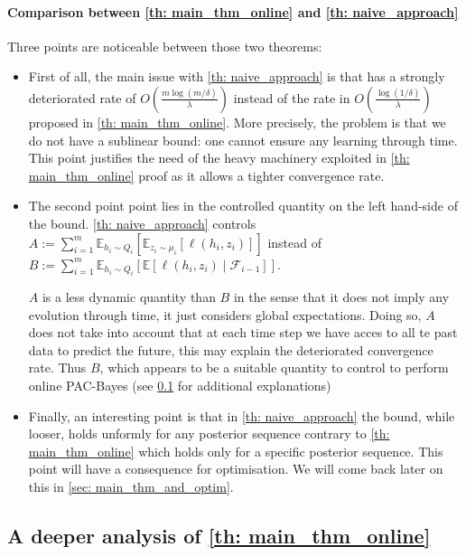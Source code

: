 \paragraph{Comparison between \cref{th: main_thm_online} and \cref{th: naive_approach}}   Three points are noticeable between those two theorems:

\begin{itemize}
  \item First of all, the main issue with \cref{th: naive_approach} is that has a strongly deteriorated rate of $O\left(\frac{m\log(m/\delta)}{\lambda} \right)$ instead of the rate in  $O\left(\frac{\log(1/\delta)}{\lambda} \right)$ proposed in \cref{th: main_thm_online}.
  More precisely, the problem is that we do not have a sublinear bound: one cannot ensure any learning through time.
  This point justifies the need of the heavy machinery exploited in \cref{th: main_thm_online} proof as it allows a tighter convergence rate.
  \item The second point point lies in the controlled quantity on the left hand-side of the bound. \cref{th: naive_approach} controls $A:=\sum_{i=1}^m \mathbb{E}_{h_i\sim Q_{i}}\left[ \mathbb{E}_{z_i\sim \mu_i}[\ell(h_i,z_i)]    \right]$
  instead of $B:=\sum_{i=1}^m \mathbb{E}_{h_i\sim Q_{i}}\left[ \mathbb{E}[\ell(h_i,z_i) \mid \mathcal{F}_{i-1}]    \right]$.

  $A$ is a less dynamic quantity than $B$ in the sense that it does not imply any evolution through time, it just considers global expectations. Doing so, $A$ does not take into account that at each time step we have acces to all te past data to predict the future, this may explain the deteriorated convergence rate. Thus $B$, which appears to be a suitable quantity to control to perform online PAC-Bayes (see \cref{sec: deeper_analysis_main_thm} for additional explanations)

  \item Finally, an interesting point is that in \cref{th: naive_approach} the bound, while looser, holds unformly for any posterior sequence contrary to \cref{th: main_thm_online} which holds only for a specific posterior sequence. This point will have a consequence for optimisation. We will come back later on this in \cref{sec: main_thm_and_optim}.
\end{itemize}




\subsection{A deeper analysis of \cref{th: main_thm_online}}
\label{sec: deeper_analysis_main_thm}

